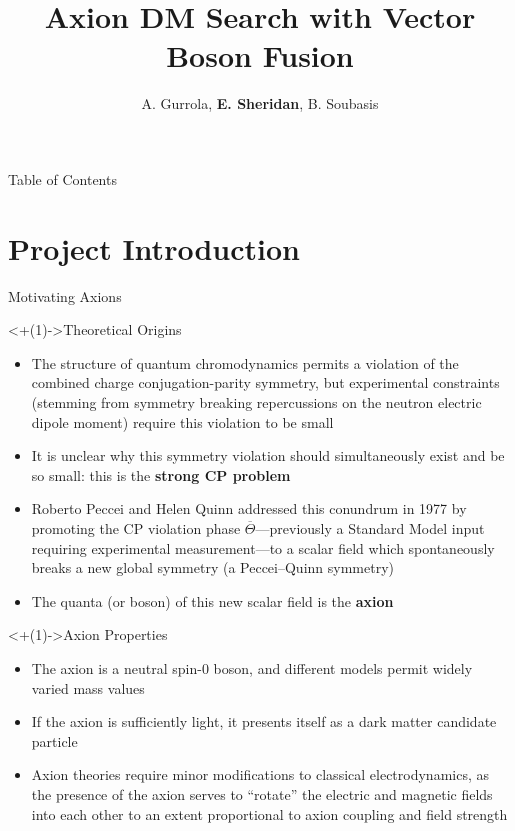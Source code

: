 \documentclass[]{beamer}
\title[VBF Axion DM Search]{Axion DM Search with Vector Boson Fusion}
\author[E. Sheridan]{A. Gurrola\inst{1}, \textbf{E. Sheridan}\inst{1}, B. Soubasis\inst{1}}
\institute{Vanderbilt University\inst{1}}
\begin{document}
\frame{\titlepage}

\begin{frame}{Table of Contents}
\tableofcontents
\end{frame}



%
%
\section{Project Introduction}

\begin{frame}{Motivating Axions}
    \begin{block}<+(1)->{Theoretical Origins}
        \begin{itemize}
            \item The structure of quantum chromodynamics permits a violation of the combined charge conjugation-parity symmetry, but experimental constraints (stemming from symmetry breaking repercussions on the neutron electric dipole moment) require this violation to be small
            \item It is unclear why this symmetry violation should simultaneously exist and be so small: this is the \textbf{strong CP problem}
            \item Roberto Peccei and Helen Quinn addressed this conundrum in 1977 by promoting the CP violation phase $\overline{\Theta}$---previously a Standard Model input requiring experimental measurement---to a scalar field which spontaneously breaks a new global symmetry (a Peccei–Quinn symmetry)
            \item The quanta (or boson) of this new scalar field is the \textbf{axion}
        \end{itemize}
    \end{block}
    
    \smallskip
    
    \begin{block}<+(1)->{Axion Properties}
        \begin{itemize}
            \item The axion is a neutral spin-$0$ boson, and different models permit widely varied mass values
            \item If the axion is sufficiently light, it presents itself as a dark matter candidate particle
            \item Axion theories require minor modifications to classical electrodynamics, as the presence of the axion serves to ``rotate'' the electric and magnetic fields into each other to an extent proportional to axion coupling and field strength 
        \end{itemize}
    \end{block}
    

\end{frame}
\end{document}
